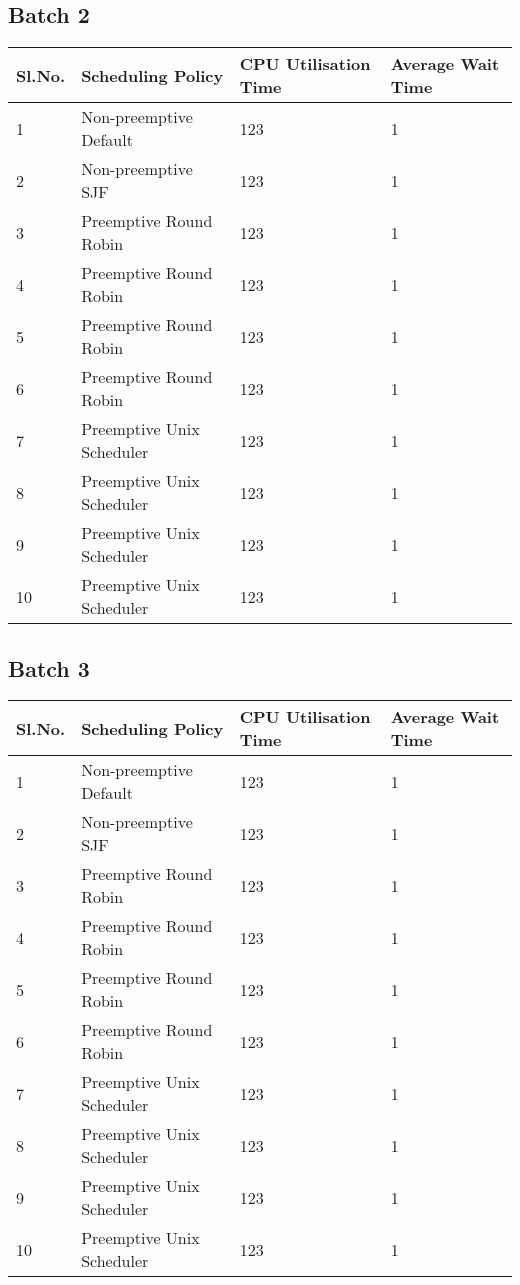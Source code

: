 \documentclass{article}
\begin{document}
\subsection{Batch 2}
\begin{center}
    \begin{tabular}{| l | l | l | l |}
    \hline
    Sl.No. & Scheduling Policy & CPU Utilisation Time & Average Wait Time \\ \hline
    1 & Non-preemptive Default & 123 & 1 \\
    2 & Non-preemptive SJF & 123 & 1 \\
    3 & Preemptive Round Robin & 123 & 1 \\
    4 & Preemptive Round Robin & 123 & 1 \\
    5 & Preemptive Round Robin & 123 & 1 \\
    6 & Preemptive Round Robin & 123 & 1 \\
    7 & Preemptive Unix Scheduler & 123 & 1 \\
    8 & Preemptive Unix Scheduler & 123 & 1 \\
    9 & Preemptive Unix Scheduler & 123 & 1 \\
    10 & Preemptive Unix Scheduler & 123 & 1 \\
    \hline
    \end{tabular}
\end{center}
\subsection{Batch 3}
\begin{center}
    \begin{tabular}{| l | l | l | l |}
    \hline
    Sl.No. & Scheduling Policy & CPU Utilisation Time & Average Wait Time \\ \hline
    1 & Non-preemptive Default & 123 & 1 \\
    2 & Non-preemptive SJF & 123 & 1 \\
    3 & Preemptive Round Robin & 123 & 1 \\
    4 & Preemptive Round Robin & 123 & 1 \\
    5 & Preemptive Round Robin & 123 & 1 \\
    6 & Preemptive Round Robin & 123 & 1 \\
    7 & Preemptive Unix Scheduler & 123 & 1 \\
    8 & Preemptive Unix Scheduler & 123 & 1 \\
    9 & Preemptive Unix Scheduler & 123 & 1 \\
    10 & Preemptive Unix Scheduler & 123 & 1 \\
    \hline
    \end{tabular}
\end{center}
\end{document}
